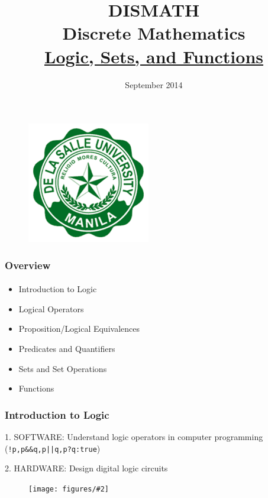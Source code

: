 \documentclass{beamer}
\newcommand{\ns}{\vspace{-0.5cm}}  %
\newcommand{\fig}[2]{
\begin{center}
\begin{figure}
\texttt{[image: figures/\#2]}
\end{figure}
\end{center}
}
\begin{document}
\ECFAugie

\begin{frame}

\begin{center}
\begin{figure}
\includegraphics[scale=0.3]{figures/dlsulogo}
\end{figure}
\end{center}
\ns

\title{DISMATH \\ Discrete Mathematics \\ \underline{Logic, Sets, and Functions}}
 
\date{September 2014}
\maketitle
\end{frame}

\begin{frame}
\frametitle{Overview}
\framesubtitle{}
\begin{itemize} 
\huge
\item <1-> Introduction to Logic
\item <2-> Logical Operators  
\item <3-> Proposition/Logical Equivalences
\item <4-> Predicates and Quantifiers
\item <5-> Sets and Set Operations
\item <6-> Functions
\end{itemize}
\end{frame}




\begin{frame}
\frametitle{Introduction to Logic}
\Large
\begin{block}{1. SOFTWARE:}
Understand logic operators in computer programming (\texttt{!p,p\&\&q,p||q,p?q:true})
\end{block}

\begin{block}{2. HARDWARE:}
\center Design digital logic circuits
\end{block}
\fig{0.5}{logicckt}

\end{frame}
\end{document}
